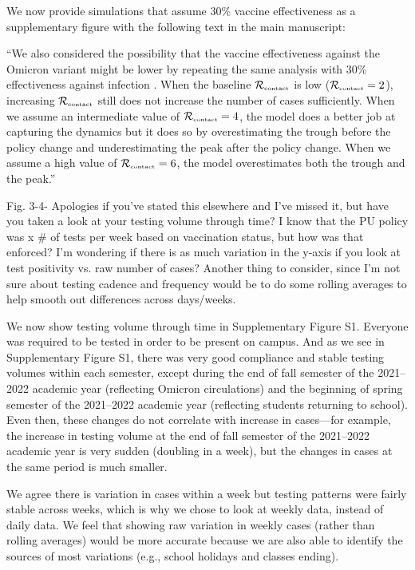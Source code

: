 \documentclass[12pt]{article}
\newcommand{\Rx}[1]{\ensuremath{{\mathcal R}_{#1}}}
\newcommand{\Rc}{\Rx{\textrm{\tiny{contact}}}}
\newcommand{\revtext}{\textsf}
\begin{document}
We now provide simulations that assume 30\% vaccine effectiveness as a supplementary figure with the following text in the main manuscript:

``We also considered the possibility that the vaccine effectiveness against the Omicron variant might be lower by repeating the same analysis with 30\% effectiveness against infection \citep{tan2023vaccine}.
When the baseline $\Rc$ is low ($\Rc=2$), increasing $\Rc$ still does not increase the number of cases sufficiently.
When we assume an intermediate value of $\Rc=4$, the model does a better job at capturing the dynamics but it does so by overestimating the trough before the policy change and underestimating the peak after the policy change.
When we assume a high value of $\Rc=6$, the model overestimates both the trough and the peak.''


\revtext{Fig. 3-4- Apologies if you’ve stated this elsewhere and I’ve missed it, but have you taken a look at your testing volume through time? I know that the PU policy was x \# of tests per week based on vaccination status, but how was that enforced? I’m wondering if there is as much variation in the y-axis if you look at test positivity vs. raw number of cases? Another thing to consider, since I’m not sure about testing cadence and frequency would be to do some rolling averages to help smooth out differences across days/weeks.}

We now show testing volume through time in Supplementary Figure S1.
Everyone was required to be tested in order to be present on campus. 
And as we see in Supplementary Figure S1, there was very good compliance and stable testing volumes within each semester, except during the end of fall semester of the 2021--2022 academic year (reflecting Omicron circulations) and the beginning of spring semester of the 2021--2022 academic year (reflecting students returning to school).
Even then, these changes do not correlate with increase in cases---for example, the increase in testing volume at the end of fall semester of the 2021--2022 academic year is very sudden (doubling in a week), but the changes in cases at the same period is much smaller.

We agree there is variation in cases within a week but testing patterns were fairly stable across weeks, which is why we chose to look at weekly data, instead of daily data.
We feel that showing raw variation in weekly cases (rather than rolling averages) would be more accurate because we are also able to identify the sources of most variations (e.g., school holidays and classes ending).
\end{document}
